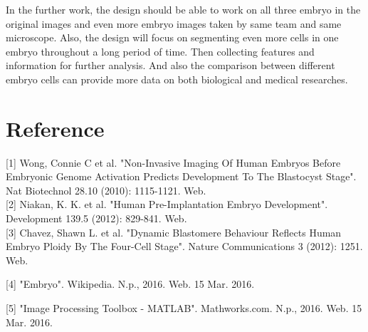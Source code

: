 \documentclass[12pt]{article}
\begin{document}
\noindent \qquad In the further work, the design should be able to work on all three embryo in the original images and even more embryo images taken by same team and same microscope. Also, the design will focus on segmenting even more cells in one embryo throughout a long period of time. Then collecting features and information for further analysis. And also the comparison between different embryo cells can provide more data on both biological and medical researches. \\

\newpage \section{Reference}

\hspace{1 mm} [1] Wong, Connie C et al. "Non-Invasive Imaging Of Human Embryos Before Embryonic Genome Activation Predicts Development To The Blastocyst Stage". Nat Biotechnol 28.10 (2010): 1115-1121. Web. \\

\noindent \hspace{1 mm} [2] Niakan, K. K. et al. "Human Pre-Implantation Embryo Development". Development 139.5 (2012): 829-841. Web. \\

\noindent \hspace{1 mm} [3] Chavez, Shawn L. et al. "Dynamic Blastomere Behaviour Reflects Human Embryo Ploidy By The Four-Cell Stage". Nature Communications 3 (2012): 1251. Web.

\noindent \hspace{1 mm} [4] "Embryo". Wikipedia. N.p., 2016. Web. 15 Mar. 2016.

\noindent \hspace{1 mm} [5] "Image Processing Toolbox - MATLAB". Mathworks.com. N.p., 2016. Web. 15 Mar. 2016.
\end{document}

